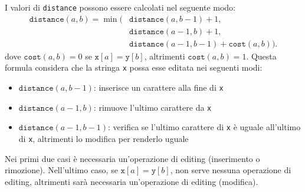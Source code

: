 I valori di \texttt{distance} possono essere calcolati nel seguente modo:
\begin{equation*}
\begin{split}
\texttt{distance}(a,b) = \min(& \texttt{distance}(a,b-1)+1, \\
                           & \texttt{distance}(a-1,b)+1, \\
                           & \texttt{distance}(a-1,b-1)+\texttt{cost}(a,b)).
\end{split}
\end{equation*}
dove $\texttt{cost}(a,b)=0$ se $\texttt{x}[a]=\texttt{y}[b]$,
altrimenti $\texttt{cost}(a,b)=1$.
Questa formula considera che la stringa \texttt{x} possa
esse editata nei seguenti modi:
\begin{itemize}
\item $\texttt{distance}(a,b-1)$: inserisce un carattere alla fine di \texttt{x}
\item $\texttt{distance}(a-1,b)$: rimuove l'ultimo carattere da \texttt{x}
\item $\texttt{distance}(a-1,b-1)$: verifica se l'ultimo carattere di \texttt{x} è uguale all'ultimo di \texttt{x},
altrimenti lo modifica per renderlo uguale 
\end{itemize}
Nei primi due casi è necessaria un'operazione di editing
(inserimento o rimozione).
Nell'ultimo caso, se $\texttt{x}[a]=\texttt{y}[b]$,
non serve nessuna operazione di editing, 
altrimenti sarà necessaria un'operazione di editing (modifica).

